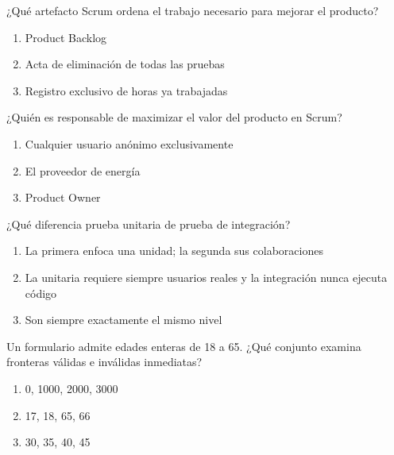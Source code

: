 \noindent\begin{minipage}{\linewidth}\setlength{\parskip}{4pt}\label{q:S-008}
¿Qué artefacto Scrum ordena el trabajo necesario para mejorar el producto?
\begin{enumerate}[label=\Alph*),nosep]
\item Product Backlog
\item Acta de eliminación de todas las pruebas
\item Registro exclusivo de horas ya trabajadas
\end{enumerate}\end{minipage}\par\medskip

\noindent\begin{minipage}{\linewidth}\setlength{\parskip}{4pt}\label{q:S-009}
¿Quién es responsable de maximizar el valor del producto en Scrum?
\begin{enumerate}[label=\Alph*),nosep]
\item Cualquier usuario anónimo exclusivamente
\item El proveedor de energía
\item Product Owner
\end{enumerate}\end{minipage}\par\medskip

\noindent\begin{minipage}{\linewidth}\setlength{\parskip}{4pt}\label{q:S-010}
¿Qué diferencia prueba unitaria de prueba de integración?
\begin{enumerate}[label=\Alph*),nosep]
\item La primera enfoca una unidad; la segunda sus colaboraciones
\item La unitaria requiere siempre usuarios reales y la integración nunca ejecuta código
\item Son siempre exactamente el mismo nivel
\end{enumerate}\end{minipage}\par\medskip

\noindent\begin{minipage}{\linewidth}\setlength{\parskip}{4pt}\label{q:S-011}
Un formulario admite edades enteras de 18 a 65. ¿Qué conjunto examina fronteras válidas e inválidas inmediatas?
\begin{enumerate}[label=\Alph*),nosep]
\item 0, 1000, 2000, 3000
\item 17, 18, 65, 66
\item 30, 35, 40, 45
\end{enumerate}\end{minipage}\par\medskip

